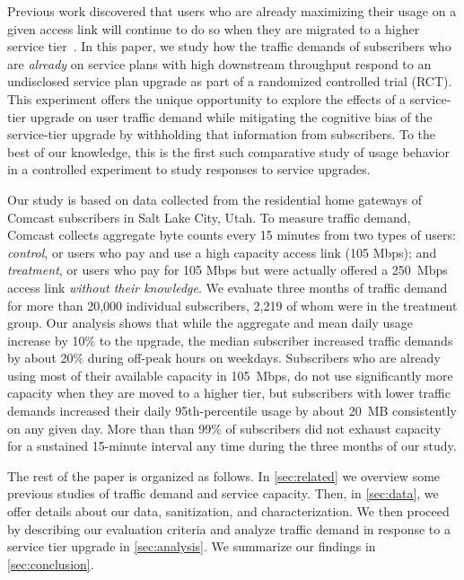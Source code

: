 
Previous work discovered that users who are already maximizing their
usage on a given access link will continue to do so when they are
migrated to a higher service tier~\cite{dasu-imc2014}. In this paper, we
study how the traffic demands of subscribers who are {\em already} on service
plans with high downstream throughput respond to an undisclosed service
plan upgrade as part of a randomized controlled trial (RCT). This
experiment offers the unique opportunity to explore the effects of a
service-tier upgrade on user traffic demand while mitigating the
cognitive bias of the service-tier upgrade by withholding that
information from subscribers. To the best of our knowledge, this is the
first such comparative study of usage behavior in a controlled
experiment to study responses to service upgrades.

Our study is based on data collected from the residential home gateways
of Comcast subscribers in Salt Lake City, Utah. To measure traffic
demand, Comcast collects
aggregate byte counts every 15 minutes from two types of
users: {\em control}, or users who pay and use a high capacity access
link (105 Mbps); and {\em treatment}, or users who pay for 105 Mbps but
were actually offered a 250~Mbps access link {\em without their
  knowledge}.  We evaluate three months of traffic demand for more than
20,000 individual subscribers, 2,219 of whom were in the treatment
group. Our analysis shows that while the aggregate and mean daily usage
increase by 10\% to the upgrade, the median subscriber
increased traffic demands by about 20\%
during off-peak hours on weekdays. Subscribers who are already using most of their
available capacity in 105~Mbps, do not use significantly more capacity
when they are moved to a higher tier, but subscribers with lower traffic demands
increased their daily 95th-percentile usage by about
20~MB consistently on any given day. More than than 99\% of subscribers did not
exhaust capacity for a sustained 15-minute interval any time during the
three months of our study.

The rest of the paper is organized as follows. In \autoref{sec:related} we 
overview some previous studies of traffic demand and service capacity. Then, in 
\autoref{sec:data}, we offer details about our data, sanitization, and 
characterization. We then proceed by describing our evaluation criteria and 
analyze traffic demand in response to a service tier upgrade in 
\autoref{sec:analysis}.
We summarize our findings in 
\autoref{sec:conclusion}.
